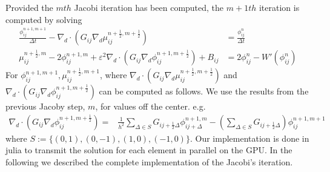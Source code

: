 \documentclass{mimosis}
\begin{document}
Provided the \(mth\) Jacobi iteration has been computed, the \(m+1th\) iteration is computed by solving
\begin{equation}
\begin{aligned}
\frac{\phi_{ij}^{n+1,m+1}}{\Delta t}  -  \nabla _d \cdot (G_{ij} \nabla_d \mu_{ij}^{n+\frac{1}{2},m+\frac{1}{2}} ) &= \frac{ \phi_{ij}^{n}}{\Delta t}  \\
 \mu_{ij}^{n+\frac{1}{2},m} - 2\phi_{ij}^{n+1,m} + \varepsilon^2  \nabla_d \cdot  (G_{ij} \nabla _d \phi_{ij}^{n+1,m+\frac{1}{2}} ) + B_{ij} &=2\phi _{ij}^n - W'(\phi_{ij}^n)
\end{aligned}
\end{equation}
For \(\phi_{ij}^{n+1,m+1} , \mu_{ij}^{n+\frac{1}{2},m+1}\),
where \(\nabla _d \cdot (G_{ij} \nabla_d \mu_{ij}^{n+\frac{1}{2},m+\frac{1}{2}} )\) and \(\nabla_d \cdot  (G_{ij} \nabla _d \phi_{ij}^{n+1,m+\frac{1}{2}} )\) can be computed as follows. We use the results from the previous Jacoby step, \(m\), for values off the center. e.g.
\begin{equation}
\begin{aligned}
 \nabla _d \cdot (G_{ij} \nabla_d \phi_{ij}^{n+1,m+\frac{1}{2}} )  =&
\frac{1}{h^2}
\sum_{\Delta \in S} G_{ij + \frac{1}{2} \Delta}\phi_{ij + \Delta}^{n+1,m}  -
\left(
\sum_{\Delta \in S}  G_{ij+\frac{1}{2} \Delta}
\right)\phi_{ij}^{n+1,m+1}
\end{aligned}
\end{equation}
where \(S:= \{ (0,1) , (0,-1) , (1,0) , (-1,0)\}\).
Our implementation is done in julia to transmit the solution for each element in parallel on the GPU. In the following we described the complete implementation of the Jacobi's iteration.
\end{document}
